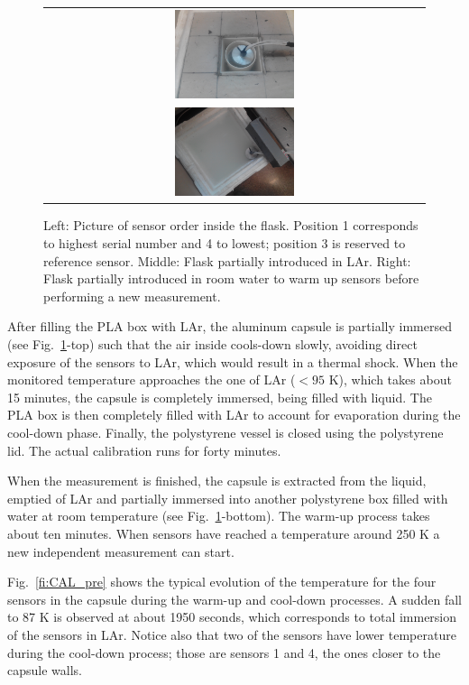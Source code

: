 \begin{figure}[htbp]
\begin{tabular}{ c } 
\includegraphics[width=0.32\textwidth]{images/figure_8_b.jpg} \\
\includegraphics[width=0.32\textwidth]{images/figure_8_c.jpg} 
\end{tabular}
\caption{Left: Picture of sensor order inside the flask. Position 1 corresponds to highest serial number and 4 to lowest; position 3 is reserved to reference sensor.
 Middle: Flask partially introduced in LAr.
 Right: Flask partially introduced in room water to warm up sensors before performing a new measurement.
\label{fi:CAL_procedure}}
\end{figure}

After filling the PLA box with LAr, the aluminum capsule is partially immersed (see Fig.~\ref{fi:CAL_procedure}-top) such that the air inside cools-down slowly, avoiding direct exposure of the sensors to LAr, which would result in a thermal shock. When the monitored temperature approaches the one of LAr ($< 95$ K), which takes about 15 minutes, the capsule is completely immersed, being filled with liquid. The PLA box is then completely filled with LAr to account for evaporation during the cool-down phase. Finally, the polystyrene vessel is closed using the polystyrene lid. The actual calibration runs for forty minutes. 

When the measurement is finished, the capsule is extracted from the liquid, emptied of LAr and partially immersed into another polystyrene box filled with water at room temperature (see Fig.~\ref{fi:CAL_procedure}-bottom). The warm-up process takes about ten minutes. When sensors have reached a temperature around 250 K a new independent measurement can start. 

Fig.~\ref{fi:CAL_pre} shows the typical evolution of the temperature for the four sensors in the capsule during the warm-up and cool-down processes. A sudden fall to 87 K is observed at about 1950 seconds, which corresponds to total immersion of the sensors in LAr. Notice also that two of the sensors have lower temperature during the cool-down process; those are sensors 1 and 4, the ones closer to the capsule walls.  

